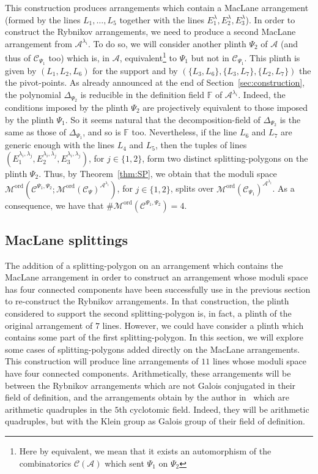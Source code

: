 \documentclass[11pt, a4paper]{amsart}
\theoremstyle{definition}
\theoremstyle{remark}
\newcommand{\FF}{\mathds{F}}
\newcommand{\A}{\mathcal{A}}
\newcommand{\C}{\mathcal{C}}
\newcommand{\M}{\mathcal{M}}
\newcommand{\ord}{\text{ord}}
\begin{document}
This construction produces arrangements which contain a MacLane arrangement (formed by the lines $L_1,\dots,L_5$ together with the lines $E_1^\lambda, E_2^\lambda, E_3^\lambda$). In order to construct the Rybnikov arrangements, we need to produce a second MacLane arrangement from $\A^{\lambda_i}$. To do so, we will consider another plinth $\Psi_2$ of $\A$ (and thus of $\C_{\Psi_1	}$ too) which is, in $\A$, equivalent\footnote{Here by equivalent, we mean that it exists an automorphism of the combinatorics $\C(\A)$ which sent $\Psi_1$ on $\Psi_2$} to $\Psi_1$ but not in $\C_{\Psi_1}$. This plinth is given by $(L_1,L_2,L_6)$ for the support and by $(\{L_3,L_6\}, \{L_3,L_7\}, \{L_2,L_7\})$ the the pivot-points. As already announced at the end of Section~\ref{sec:construction}, the polynomial $\Delta_{\Psi_2}$ is reducible in the definition field $\FF$ of $\A^{\lambda_i}$. Indeed, the conditions imposed by the plinth $\Psi_2$ are projectively equivalent to those imposed by the plinth $\Psi_1$. So it seems natural that the decomposition-field of $\Delta_{\Psi_2}$ is the same as those of $\Delta_{\Psi_1}$, and so is $\FF$ too. Nevertheless, if the line $L_6$ and $L_7$ are generic enough with the lines $L_4$ and $L_5$, then the tuples of lines $(E_1^{\lambda_i,\lambda_j}, E_2^{\lambda_i,\lambda_j}, E_3^{\lambda_i,\lambda_j})$, for $j\in\{1,2\}$, form two distinct splitting-polygons on the plinth $\Psi_2$. Thus, by Theorem~\ref{thm:SP}, we obtain that the moduli space $\M^\ord(\C^{\Psi_1,\Psi_2}; \M^\ord(\C_\Psi)^{\A^{\lambda_i}})$, for $j\in\{1,2\}$, splits over $\M^\ord(\C_{\Psi_1})^{\A^{\lambda_i}}$. As a consequence, we have that $\# \M^\ord(\C^{\Psi_1,\Psi_2}) = 4$.


\subsection{MacLane splittings}\mbox{}

The addition of a splitting-polygon on an arrangement which contains the MacLane arrangement in order to construct an arrangement whose moduli space has four connected components have been successfully use in the previous section to re-construct the Rybnikov arrangements. In that construction, the plinth considered to support the second splitting-polygon is, in fact, a plinth of the original arrangement of $7$ lines. However, we could have consider a plinth which contains some part of the first splitting-polygon. In this section, we will explore some cases of splitting-polygons added directly on the MacLane arrangements. This construction will produce line arrangements of $11$ lines whose moduli space have four connected components. Arithmetically, these arrangements will be between the Rybnikov arrangements which are not Galois conjugated in their field of definition, and the arrangements obtain by the author in~\cite{Gue:ZP,Gue:LLN} which are arithmetic quadruples in the $5$th cyclotomic field. Indeed, they will be arithmetic quadruples, but with the Klein group as Galois group of their field of definition.
\end{document}
